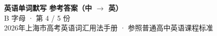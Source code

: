 \documentclass[10pt,a4paper]{article}
\begin{document}
\pagestyle{plain}

\begin{center}
{\LARGE\bfseries 英语单词默写 \quad 参考答案（中 $\to$ 英）}\\[0.22em]
{\large B 字母 · 第 4 / 5 份}\\[0.18em]
{\small 2026年上海市高考英语词汇用法手册 · 参照普通高中英语课程标准}
\end{center}

\vspace{0.2em}
\noindent{\color{rulegray}\rule{\textwidth}{0.8pt}}

\vspace{0.35em}

\vspace{0.25em}
\renewcommand{\arraystretch}{1.32}
\end{document}
